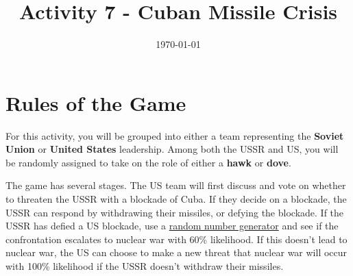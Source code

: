 \documentclass[12pt]{exam}
\title{Activity 7 - Cuban Missile Crisis}
\date{\today}
\begin{document}
\section*{Rules of the Game}

For this activity, you will be grouped into either a team representing the \textbf{Soviet Union} or \textbf{United States} leadership.
Among both the USSR and US, you will be randomly assigned to take on the role of either a \textbf{hawk} or \textbf{dove}.

The game has several stages. 
The US team will first discuss and vote on whether to threaten the USSR with a blockade of Cuba.
If they decide on a blockade, the USSR can respond by withdrawing their missiles, or defying the blockade.
If the USSR has defied a US blockade, use a \href{https://pickerwheel.com/tools/random-number-generator/}{random number generator} and see if the confrontation escalates to nuclear war with 60\% likelihood.
If this doesn't lead to nuclear war, the US can choose to make a new threat that nuclear war will occur with 100\% likelihood if the USSR doesn't withdraw their missiles.
\end{document}

